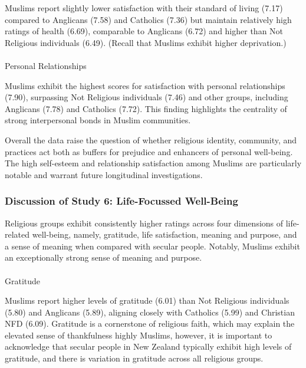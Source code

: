 \documentclass[
  single column]{article}
\makeatletter
\let\oldparagraph\paragraph
\renewcommand{\paragraph}{
    \@ifstar
      \xxxParagraphStar
      \xxxParagraphNoStar
  }
\newcommand{\xxxParagraphStar}[1]{\oldparagraph*{#1}\mbox{}}
\newcommand{\xxxParagraphNoStar}[1]{\oldparagraph{#1}\mbox{}}
\makeatother
\begin{document}
Muslims report slightly lower satisfaction with their standard of living
(7.17) compared to Anglicans (7.58) and Catholics (7.36) but maintain
relatively high ratings of health (6.69), comparable to Anglicans (6.72)
and higher than Not Religious individuals (6.49). (Recall that Muslims
exhibit higher deprivation.)

\paragraph{Personal Relationships}\label{personal-relationships}

Muslims exhibit the highest scores for satisfaction with personal
relationships (7.90), surpassing Not Religious individuals (7.46) and
other groups, including Anglicans (7.78) and Catholics (7.72). This
finding highlights the centrality of strong interpersonal bonds in
Muslim communities.

Overall the data raise the question of whether religious identity,
community, and practices act both as buffers for prejudice and enhancers
of personal well-being. The high self-esteem and relationship
satisfaction among Muslims are particularly notable and warrant future
longitudinal investigations.

\subsubsection{Discussion of Study 6: Life-Focussed
Well-Being}\label{discussion-of-study-6-life-focussed-well-being}

Religious groups exhibit consistently higher ratings across four
dimensions of life-related well-being, namely, gratitude, life
satisfaction, meaning and purpose, and a sense of meaning when compared
with secular people. Notably, Muslims exhibit an exceptionally strong
sense of meaning and purpose.

\paragraph{Gratitude}\label{gratitude}

Muslims report higher levels of gratitude (6.01) than Not Religious
individuals (5.80) and Anglicans (5.89), aligning closely with Catholics
(5.99) and Christian NFD (6.09). Gratitude is a cornerstone of religious
faith, which may explain the elevated sense of thankfulness highly
Muslims, however, it is important to acknowledge that secular people in
New Zealand typically exhibit high levels of gratitude, and there is
variation in gratitude across all religious groups.
\end{document}

